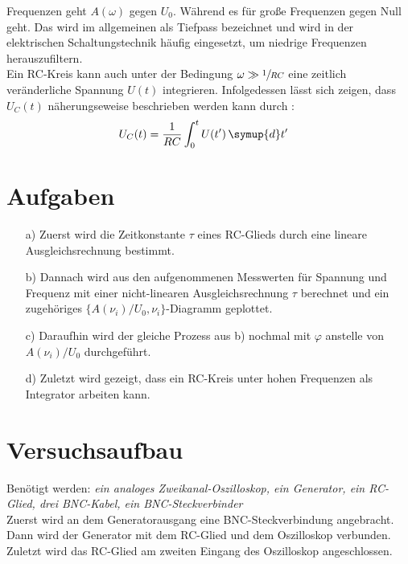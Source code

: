   Frequenzen geht $A(\omega)$ gegen $U_0$. Während es für große Frequenzen
  gegen Null geht.
  Das wird im allgemeinen als Tiefpass bezeichnet und  wird in der 
  elektrischen Schaltungstechnik häufig eingesetzt, um niedrige Frequenzen
  herauszufiltern.\\
  Ein RC-Kreis kann auch unter der Bedingung $\omega \gg \sfrac{1}{RC}$ eine 
  zeitlich veränderliche Spannung $U(t)$ integrieren. Infolgedessen lässt sich 
  zeigen, dass $U_C(t)$ näherungseweise beschrieben werden kann durch \cite{V353}:
  \begin{align}
    U_C(t) &= \frac{1}{RC} \int_0^t{U(t') \, \symup{d}t'}
  \end{align}


\section{Aufgaben}
 \begin{enumerate}
    \item[a)] Zuerst wird die Zeitkonstante $\tau$ eines RC-Glieds durch 
              eine lineare Ausgleichsrechnung bestimmt.

    \item[b)] Dannach wird aus den aufgenommenen Messwerten für Spannung und 
              Frequenz mit einer nicht-linearen Ausgleichsrechnung $\tau$ berechnet 
              und ein zugehöriges $\{ A(\nu _i)/U_0,\nu _i \}$-Diagramm geplottet.
  
    \item[c)] Daraufhin wird der gleiche Prozess aus b) nochmal mit
              $\varphi$ anstelle von $A(\nu _i)/U_0$ durchgeführt.
  
    \item[d)] Zuletzt wird gezeigt, dass ein RC-Kreis unter hohen Frequenzen 
              als Integrator arbeiten kann.
  \end{enumerate}

  



\section{Versuchsaufbau}
Benötigt werden: \textit{ein analoges Zweikanal-Oszilloskop, ein Generator, ein RC-Glied, drei BNC-Kabel, ein BNC-Steckverbinder }\\
Zuerst wird an dem Generatorausgang eine BNC-Steckverbindung angebracht. 
Dann wird der Generator mit dem RC-Glied und dem Oszilloskop verbunden. \\
Zuletzt wird das RC-Glied am zweiten Eingang des Oszilloskop angeschlossen.

